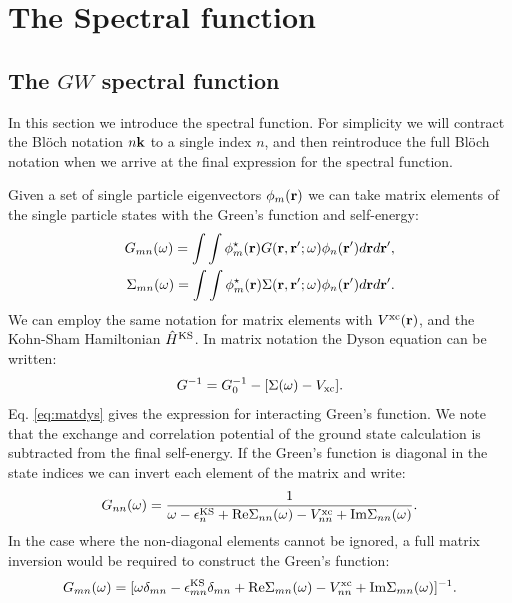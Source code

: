 \section{The Spectral function}
\subsection{The $GW$ spectral function}
\label{sec:spec}
\noindent
In this section we introduce the spectral function. For simplicity we will contract the
Bl\"och notation $n{\bf k}$ to a single index $n$, and then reintroduce the full Bl\"och notation when
we arrive at the final expression for the spectral function.

Given a set of single particle eigenvectors $\phi_{m}({\bf r})$ we can take matrix elements of the
single particle states with the Green's function and self-energy:
%
\begin{eqnarray}
G_{mn}(\omega)       = \int \int \phi_{m}^{\star}({\bf r}) G({\bf r},{\bf r}';\omega) \phi_{n}({\bf r}')  d{\bf r} d{\bf r}', \\
\Sigma_{mn}(\omega)  = \int \int \phi_{m}^{\star}({\bf r}) \Sigma({\bf r},{\bf r}';\omega) \phi_{n}({\bf r}') d{\bf r} d{\bf r}'.
\end{eqnarray}
%
We can employ the same notation for matrix elements with $V^{\rm{xc}}({\bf r})$,
and the Kohn-Sham Hamiltonian $\hat{H}^{\rm{KS}}$.
%
In matrix notation the Dyson equation \cite{inkson86} can be written:
%
\begin{equation}
\label{eq:matdys}
G^{-1} = G_{0}^{-1} - [\Sigma(\omega) - V_{\rm{xc}}].
\end{equation}
%
Eq. \ref{eq:matdys} gives the expression for interacting Green's function.
We note that the exchange and correlation potential of the ground state
calculation is subtracted from the final self-energy. If the Green's function is diagonal
in the state indices we can invert each element of the matrix and write:
%
\begin{equation}
G_{nn}(\omega) = \frac{1}{\omega -\epsilon^{\rm{KS}}_{n}+{\rm Re}\Sigma_{nn}(\omega)-V^{\rm{xc}}_{nn}+{\rm Im}\Sigma_{nn}(\omega)}.
\end{equation}
%
In the case where the non-diagonal elements cannot be ignored,
a full matrix inversion would be required to construct the Green's function:
%
\begin{equation}
G_{mn}(\omega) = [\omega \delta_{mn} - \epsilon^{\rm{KS}}_{mn}\delta_{mn} + {\rm Re}\Sigma_{mn}(\omega) - V^{\rm{xc}}_{nn} + {\rm Im}\Sigma_{mn}(\omega)]^{-1}.
\end{equation}

